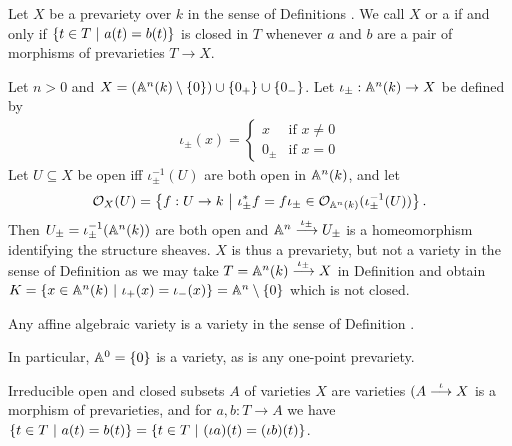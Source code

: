 \documentclass[a4paper,parskip=full,numbers=enddot]{scrreprt}
\begin{document}
\begin{defi}
\begin{rem*}
\end{rem*}


\begin{defi}[Variety]
    Let $X$ be a prevariety over $k$ in the sense of Definitions . We call $X$  or a  if and only if $\left\{t\in T\st a(t)=b(t)\right\}$ is closed in $T$ whenever $a$ and $b$ are a pair of morphisms of prevarieties $T\to X$.
\end{defi}

\begin{example}
 Let $n>0$ and $X = \left( \IA^n(k) \setminus\{0\}\right) \cup \{0_+\} \cup \{0_-\}$. Let $\iota_\pm: \IA^n(k) \to X$ be defined by
 \begin{align*}
    \iota_\pm(x) = \begin{cases} x &\text{if }x\neq 0\\
                    0_\pm &\text{if } x = 0
                   \end{cases}
 \end{align*}
 Let $U\subseteq X$ be open iff $\iota_\pm^{-1} (U)$ are both open in $\IA^n(k)$, and let 
    \begin{align*}
        \Oo_X(U) = \left\{f:U\to k\st \iota_\pm^\ast f = f \iota_\pm \in \Oo_{\IA^n(k)} (\iota_\pm^{-1}(U))\right\}.
    \end{align*}
    Then $U_\pm = \iota_\pm^{-1}(\IA^n(k))$ are both open and $\IA^n\morphism[\iota_\pm] U_\pm$ is a homeomorphism identifying the structure sheaves. $X$ is thus a prevariety, but not a variety in the sense of Definition  as we may take $T=\IA^n(k) \morphism[\iota_\pm] X$ in Definition  and obtain $K = \left\{x\in \IA^n(k)\st \iota_+(x) = \iota_-(x)\right\} = \IA^n\setminus\{0\}$ which is not closed.
\end{example}
\begin{example}
    \begin{alphanumerate}
    \item
        Any affine algebraic variety is a variety in the sense of Definition .
    \item
        In particular, $\IA^0 = \{0\}$ is a variety, as is any one-point prevariety.
    \item 
        Irreducible open and closed subsets $A$ of varieties $X$ are varieties $(A\morphism[\iota] X$ is a morphism of prevarieties, and for $a,b: T\to A$ we have $\left\{t\in T\st a(t) = b(t) \right\} = \left\{t \in T\st(\iota a)(t) = (\iota b)(t) \right\}$.

\end{alphanumerate}
\end{example}
\end{defi}
\end{document}
